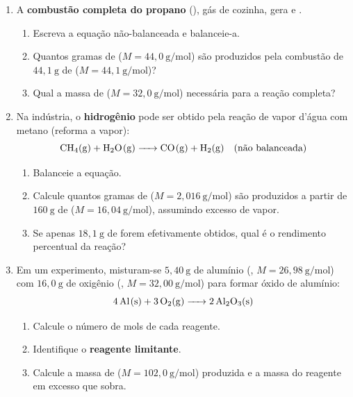 \documentclass[10pt,a4paper]{article}
\begin{document}
\begin{enumerate}[resume]

\item A \textbf{combustão completa do propano} (), gás de
  cozinha, gera  e .
  \begin{enumerate}
    \item Escreva a equação não-balanceada e balanceie-a.
    \item Quantos gramas de  ($M = 44{,}0~\text{g/mol}$)
          são produzidos pela combustão de $44{,}1~\text{g}$ de
           ($M = 44{,}1~\text{g/mol}$)?
    \item Qual a massa de  ($M = 32{,}0~\text{g/mol}$)
          necessária para a reação completa?
  \end{enumerate}

\item Na indústria, o \textbf{hidrogênio} pode ser obtido pela
  reação de vapor d'água com metano (reforma a vapor):
  \[
    \ce{CH4(g) + H2O(g) -> CO(g) + H2(g)} \quad \text{(não balanceada)}
  \]
  \begin{enumerate}
    \item Balanceie a equação.
    \item Calcule quantos gramas de  ($M = 2{,}016~\text{g/mol}$)
          são produzidos a partir de $160~\text{g}$ de 
          ($M = 16{,}04~\text{g/mol}$), assumindo excesso de vapor.
    \item Se apenas $18{,}1~\text{g}$ de  forem efetivamente
          obtidos, qual é o rendimento percentual da reação?
  \end{enumerate}

\item Em um experimento, misturam-se $5{,}40~\text{g}$ de alumínio
  (, $M = 26{,}98~\text{g/mol}$) com $16{,}0~\text{g}$ de
  oxigênio (, $M = 32{,}00~\text{g/mol}$) para formar
  óxido de alumínio:
  \[
    \ce{4 Al(s) + 3 O2(g) -> 2 Al2O3(s)}
  \]
  \begin{enumerate}
    \item Calcule o número de mols de cada reagente.
    \item Identifique o \textbf{reagente limitante}.
    \item Calcule a massa de 
          ($M = 102{,}0~\text{g/mol}$) produzida e a massa do
          reagente em excesso que sobra.
  \end{enumerate}


\end{enumerate}
\end{document}
